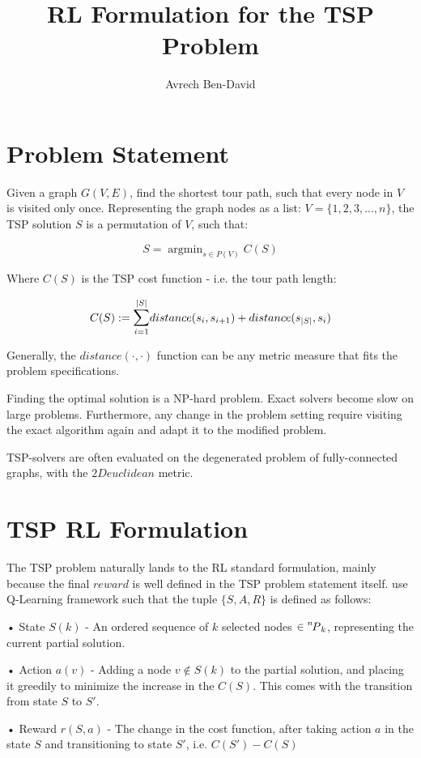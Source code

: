 \documentclass[10pt,a4paper,draft]{article}
\DeclareMathOperator*{\argmin}{argmin}
\newcommand*\perm[2][^n]{\prescript{#1\mkern-2.5mu}{}P_{#2}}
\begin{document}
\title{RL Formulation for the TSP Problem}
\author{Avrech Ben-David}
\maketitle


\section*{Problem Statement}
Given a graph $G(V,E)$, find the shortest tour path, such that every node in $V$ is visited only once. Representing the graph nodes as a list: $V = \{1,2,3,...,n\}$, the TSP solution $S$ is a permutation of $V$, such that:

\begin{equation} \label{tsp_statement}
	S = \argmin_{s \in P(V)} C(S)
\end{equation}

Where $C(S)$ is the TSP cost function - i.e. the tour path length:

\begin{equation}  \label{tsp_cost}
	C(S) := \mathlarger{\sum}_{i=1}^{|S|}{distance(s_i, s_{i+1})} + distance(s_{|S|}, s_i)
\end{equation}

Generally, the $distance(\cdot,\cdot)$ function can be any metric measure that fits the problem specifications.

Finding the optimal solution is a NP-hard problem. Exact solvers become slow on large problems. Furthermore, any change in the problem setting require visiting the exact algorithm again and adapt it to the modified problem.

TSP-solvers are often evaluated on the degenerated problem of fully-connected graphs, with the $2D euclidean$ metric. 

\section*{TSP RL Formulation}	
The TSP problem naturally lands to the RL standard formulation, mainly because the final $reward$ is well defined in the TSP problem statement itself. 
\cite{dai2017learning} use Q-Learning framework such that the tuple $\{S,A,R\}$ is defined as follows:
\begin{list}{}{}
	\item[•] State $S(k)$ - An ordered sequence of $k$ selected nodes $\in \perm[n]{k}$, representing the current partial solution.
	\item[•] Action $a(v)$ - Adding a node $v \not\in S(k)$ to the partial solution, and placing it greedily to minimize the increase in the $C(S)$. This comes with the transition from state $S$ to $S'$.
	\item[•] Reward $r(S,a)$ - The change in the cost function, after taking action $a$ in the state $S$ and transitioning to state $S'$, i.e. $C(S')-C(S)$
\end{list}
\end{document}
